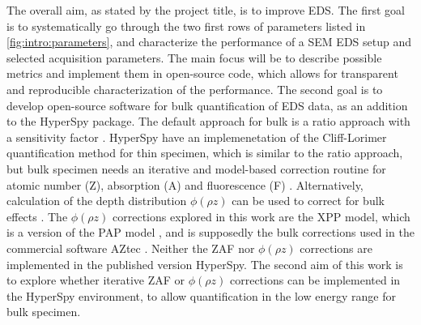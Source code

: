 The overall aim, as stated by the project title, is to improve EDS.
The first goal is to systematically go through the two first rows of parameters listed in \cref{fig:intro:parameters}, and characterize the performance of a SEM EDS setup and selected acquisition parameters.
The main focus will be to describe possible metrics and implement them in open-source code, which allows for transparent and reproducible characterization of the performance.
The second goal is to develop open-source software for bulk quantification of EDS data, as an addition to the HyperSpy package.
The default approach for bulk is a ratio approach with a sensitivity factor \cite{goldstein_scanning_2018}.
HyperSpy have an implemenetation of the Cliff-Lorimer quantification method for thin specimen, which is similar to the ratio approach, but bulk specimen needs an iterative and model-based correction routine for atomic number (Z), absorption (A) and fluorescence (F) \cite{goldstein_scanning_2018}.
Alternatively, calculation of the depth distribution $\phi (\rho z)$ can be used to correct for bulk effects \cite{goldstein_scanning_2018,pap_1991}.
The $\phi (\rho z)$ corrections explored in this work are the XPP model, which is a version of the PAP model \cite{pap_1991}, and is supposedly the bulk corrections used in the commercial software AZtec \cite{oxford_blog_XPP,aztec_manual}.
Neither the ZAF nor $\phi (\rho z)$ corrections are implemented in the published version HyperSpy.
The second aim of this work is to explore whether iterative ZAF or $\phi (\rho z)$ corrections can be implemented in the HyperSpy environment, to allow quantification in the low energy range for bulk specimen.






